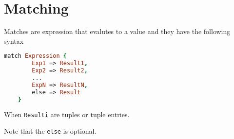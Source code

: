 \section{Matching}

Matches are expression that evalutes to a value and they have the following syntax

\begin{lstlisting}[language = Prolog]
    match Expression {
        Exp1 => Result1,
        Exp2 => Result2,
        ...
        ExpN => ResultN,
        else => Result
    }
\end{lstlisting}

When \texttt{Resulti} are tuples or tuple entries.

Note that the \texttt{else} is optional.

